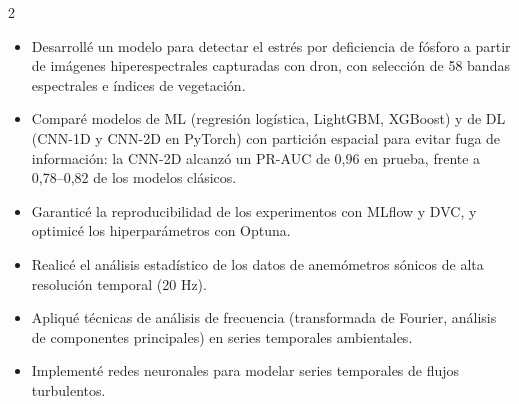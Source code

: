 \documentclass[10pt,a4paper,ragged2e,withhyper]{altacv}
\begin{document}
\begin{paracol}{2}





\begin{itemize}
\item Desarrollé un modelo para detectar el estrés por deficiencia de fósforo a partir de imágenes hiperespectrales capturadas con dron, con selección de 58 bandas espectrales e índices de vegetación.
\item Comparé modelos de ML (regresión logística, LightGBM, XGBoost) y de DL (CNN-1D y CNN-2D en PyTorch) con partición espacial para evitar fuga de información: la CNN-2D alcanzó un PR-AUC de 0,96 en prueba, frente a 0,78--0,82 de los modelos clásicos.
\item Garanticé la reproducibilidad de los experimentos con MLflow y DVC, y optimicé los hiperparámetros con Optuna.
\end{itemize}

\divider


\begin{itemize}
\item Realicé el análisis estadístico de los datos de anemómetros sónicos de alta resolución temporal (20 Hz).
\item Apliqué técnicas de análisis de frecuencia (transformada de Fourier, análisis de componentes principales) en series temporales ambientales.
\item Implementé redes neuronales para modelar series temporales de flujos turbulentos.
\end{itemize}



\end{paracol}
\end{document}
